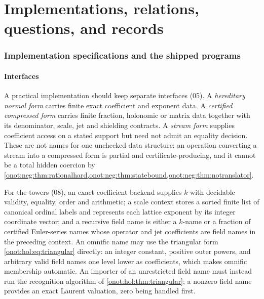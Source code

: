 \documentclass[11pt,oneside]{article}
\numberwithin{equation}{section}
\theoremstyle{definition}
\theoremstyle{remark}
\begin{document}
\part*{Implementations, relations, questions, and records}

\section{Implementation specifications and the shipped programs}\label{onot:sec:implementation}

\subsection{Interfaces}

A practical implementation should keep separate interfaces (05). A
\emph{hereditary normal form} carries finite exact coefficient and exponent data.
A \emph{certified compressed form} carries finite fraction, holonomic or matrix
data together with its denominator, scale, jet and shielding contracts. A
\emph{stream form} supplies coefficient access on a stated support but need not
admit an equality decision. These are not names for one unchecked data structure:
an operation converting a stream into a compressed form is partial and
certificate-producing, and it cannot be a total hidden coercion by
\cref{onot:neg:thm:rationalhard,onot:neg:thm:statebound,onot:neg:thm:notranslator}.

For the towers (08), an exact coefficient backend supplies $k$ with decidable
validity, equality, order and arithmetic; a scale context stores a sorted finite
list of canonical ordinal labels and represents each lattice exponent by its
integer coordinate vector; and a recursive field name is either a $k$-name or a
fraction of certified Euler-series names whose operator and jet coefficients are
field names in the preceding context. An omnific name may use the triangular form
\eqref{onot:hol:eq:triangular} directly: an integer constant, positive outer
powers, and arbitrary valid field names one level lower as coefficients, which
makes omnific membership automatic. An importer of an unrestricted field name
must instead run the recognition algorithm of \cref{onot:hol:thm:triangular}; a
nonzero field name provides an exact Laurent valuation, zero being handled first.
\end{document}
